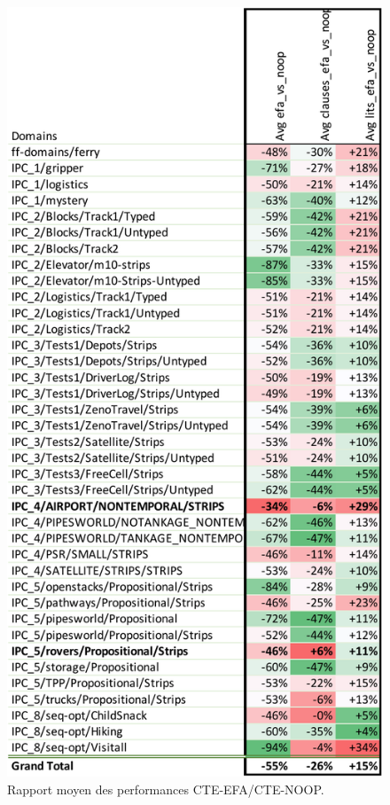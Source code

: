 \begin{figure}[ht!] \centering
\begin{center} \includegraphics[width=.75\textwidth]{tableaux/experiment-efa_vs_noop-crop.pdf} \end{center}
\caption{Rapport moyen des performances CTE-EFA/CTE-NOOP.}
\label{fig:tab-exp-efa-vs-noop}
\end{figure}

